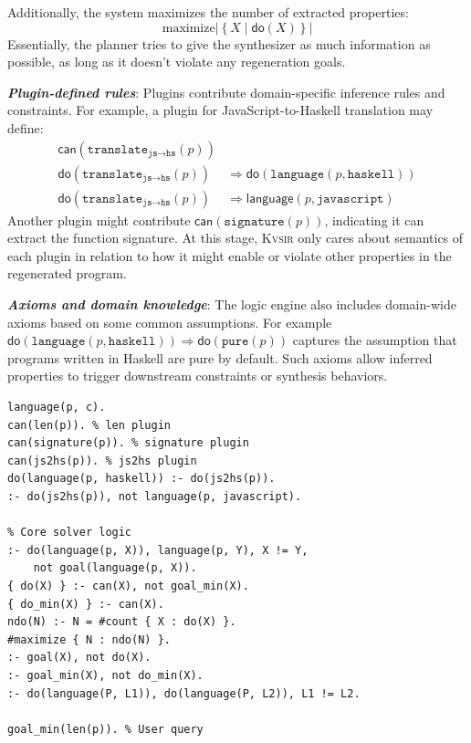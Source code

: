 \documentclass[noacm,sigplan,review]{acmart}
\def\eg{{\em e.g.}, }
\newcommand{\sys}{{\scshape Kv{\textalpha}sir}\xspace}
\newcommand{\heading}[1]{\vspace{2pt}\noindent\textbf{\emph{#1}}:\enspace}
\newcommand{\ttt}[1]{\texttt{#1}\xspace}
\begin{document}
Additionally, the system maximizes the number of extracted properties:
\[
\text{maximize} \left|\left\{ X \mid \mathsf{do}(X) \right\}\right|
\]
Essentially, the planner tries to give the synthesizer as much information
as possible, as long as it doesn't violate any regeneration goals.

\heading{Plugin-defined rules}
Plugins contribute domain-specific inference rules and constraints. For example, a plugin for JavaScript-to-Haskell translation may define:
\begin{align*}
\mathsf{can}(\texttt{translate}_{\texttt{js} \rightarrow \texttt{hs}}(p)) & \\
\mathsf{do}(\texttt{translate}_{\texttt{js} \rightarrow \texttt{hs}}(p)) &\Rightarrow \mathsf{do}(\texttt{language}(p, \texttt{haskell})) \\
\mathsf{do}(\texttt{translate}_{\texttt{js} \rightarrow \texttt{hs}}(p)) &\Rightarrow \mathsf{language}(p, \texttt{javascript})
\end{align*}
Another plugin might contribute $\mathsf{can}(\texttt{signature}(p))$, indicating it can extract the function signature. At this stage, \sys only cares about semantics of each plugin in relation to how it might enable or violate 
other properties in the regenerated program.

\heading{Axioms and domain knowledge}
The logic engine also includes domain-wide axioms based on some common assumptions.
For example
$\mathsf{do}(\texttt{language}(p, \texttt{haskell})) \Rightarrow \mathsf{do}(\texttt{pure}(p))$
captures the assumption that programs written in Haskell are pure by default.
Such axioms allow inferred properties to trigger downstream constraints or synthesis behaviors.

\begin{listing}
  \begin{verbatim}
language(p, c).
can(len(p)). % len plugin
can(signature(p)). % signature plugin
can(js2hs(p)). % js2hs plugin
do(language(p, haskell)) :- do(js2hs(p)).
:- do(js2hs(p)), not language(p, javascript).

% Core solver logic
:- do(language(p, X)), language(p, Y), X != Y,
    not goal(language(p, X)).
{ do(X) } :- can(X), not goal_min(X).
{ do_min(X) } :- can(X).
ndo(N) :- N = #count { X : do(X) }.
#maximize { N : ndo(N) }.
:- goal(X), not do(X).
:- goal_min(X), not do_min(X).
:- do(language(P, L1)), do(language(P, L2)), L1 != L2.

goal_min(len(p)). % User query
\end{verbatim}
  \caption{\textbf{Example \sys logic program.}
  This is a lightly simplified version of the logic program that produces the plan for the idiomatization task~(\cref{sec:example}). 
  The program contains facts coming from (1) the input program (written in C),
  (2) three plugins (\ttt{len}, \ttt{signature}, and \ttt{javascript2haskell}),
  (3) axioms from the logic engine (\eg a program can have one language, an analysis will be applied only if possible, all goals must be satisfied), and
  (4) the user query (the user wants to minimize the length of the program).
  }
  \label{lst:logic-example}
\end{listing}
\end{document}
